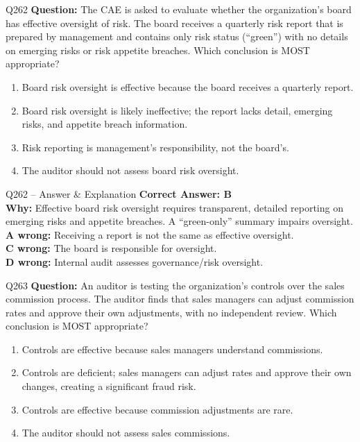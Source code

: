 \documentclass[aspectratio=169,10pt]{beamer}
\begin{document}
	\begin{frame}[t]{Q262}
		\small
		\textbf{Question:} The CAE is asked to evaluate whether the organization's board has effective oversight of risk. The board receives a quarterly risk report that is prepared by management and contains only risk status (``green'') with no details on emerging risks or risk appetite breaches. Which conclusion is MOST appropriate?
		\begin{enumerate}[label=\Alph*.,itemsep=1pt,topsep=2pt]
			\item Board risk oversight is effective because the board receives a quarterly report.
			\item Board risk oversight is likely ineffective; the report lacks detail, emerging risks, and appetite breach information.
			\item Risk reporting is management's responsibility, not the board's.
			\item The auditor should not assess board risk oversight.
		\end{enumerate}
	\end{frame}
	
	\begin{frame}[t]{Q262 -- Answer \& Explanation}
		\small
		\textbf{Correct Answer: B} \\[4pt]
		\textbf{Why:} Effective board risk oversight requires transparent, detailed reporting on emerging risks and appetite breaches. A ``green-only'' summary impairs oversight. \\[4pt]
		\textbf{A wrong:} Receiving a report is not the same as effective oversight. \\[2pt]
		\textbf{C wrong:} The board is responsible for oversight. \\[2pt]
		\textbf{D wrong:} Internal audit assesses governance/risk oversight.
	\end{frame}
	
	\begin{frame}[t]{Q263}
		\small
		\textbf{Question:} An auditor is testing the organization's controls over the sales commission process. The auditor finds that sales managers can adjust commission rates and approve their own adjustments, with no independent review. Which conclusion is MOST appropriate?
		\begin{enumerate}[label=\Alph*.,itemsep=1pt,topsep=2pt]
			\item Controls are effective because sales managers understand commissions.
			\item Controls are deficient; sales managers can adjust rates and approve their own changes, creating a significant fraud risk.
			\item Controls are effective because commission adjustments are rare.
			\item The auditor should not assess sales commissions.
		\end{enumerate}
	\end{frame}
	
\end{document}

